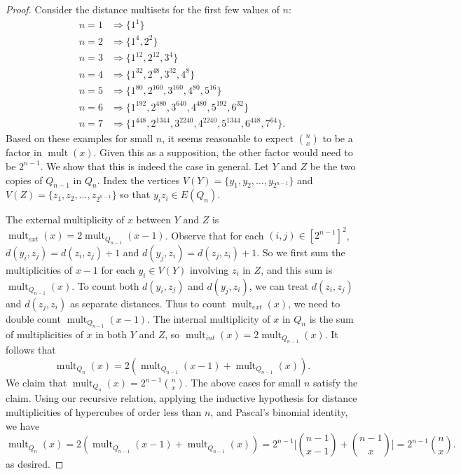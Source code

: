 \documentclass[12]{article}
\DeclareMathOperator{\mult}{mult}
\theoremstyle{definition}
\begin{document}
\begin{proof}
		Consider the distance multisets for the first few values of $n$:
		\begin{align*}
			n=1 &\Rightarrow \{1^1\}	\\
			n=2 &\Rightarrow \{1^4, 2^2\}	\\
			n=3 &\Rightarrow \{1^{12}, 2^{12}, 3^{4}\}	\\
			n=4 &\Rightarrow \{1^{32}, 2^{48}, 3^{32}, 4^{8}\}	\\
			n=5 &\Rightarrow \{1^{80}, 2^{160}, 3^{160}, 4^{80}, 5^{16}\}	\\
			n=6 &\Rightarrow \{1^{192}, 2^{480}, 3^{640}, 4^{480}, 5^{192}, 6^{32}\}	\\
			n=7 &\Rightarrow \{1^{448}, 2^{1344}, 3^{2240}, 4^{2240}, 5^{1344}, 6^{448}, 7^{64}\}.
		\end{align*}
		Based on these examples for small $n$, it seems reasonable to expect ${n \choose x}$ to be a factor in $\mult(x)$.  Given this as a supposition, the other factor would need to be $2^{n-1}$.  We show that this is indeed the case in general.
		Let $Y$ and $Z$ be the two copies of $Q_{n-1}$ in $Q_n$.  Index the vertices $V(Y) = \{y_1, y_2, \ldots, y_{2^{n-1}}\}$ and $V(Z) = \{z_1, z_2, \ldots, z_{2^{n-1}}\}$ so that $y_iz_i \in E(Q_n)$.  
		
		The external multiplicity of $x$ between $Y$ and $Z$ is $\mult_{ext}(x) = 2\mult_{Q_{n-1}}(x-1)$.  Observe that for each $(i,j) \in [2^{n-1}]^2$, $d(y_i,z_j) = d(z_i,z_j)+1$ and $d(y_j,z_i) = d(z_j,z_i) + 1$.  So we first sum the multiplicities of $x-1$ for each $y_i \in V(Y)$ involving $z_i$ in $Z$, and this sum is $\mult_{Q_{n-1}}(x)$.  To count both $d(y_i,z_j)$ and $d(y_j,z_i)$, we can treat $d(z_i,z_j)$ and $d(z_j,z_i)$ as separate distances.  Thus to count $\mult_{ext}(x)$, we need to double count $\mult_{Q_{n-1}}(x-1)$.  The internal multiplicity of $x$ in $Q_n$ is the sum of multiplicities of $x$ in both $Y$ and $Z$, so $\mult_{int}(x) = 2\mult_{Q_{n-1}}(x)$.  It follows that
		$$\mult_{Q_n}(x) = 2(\mult_{Q_{n-1}}(x-1) + \mult_{Q_{n-1}}(x)).$$
		We claim that $\mult_{Q_n}(x) = 2^{n-1}{n \choose x}$.  The above cases for small $n$ satisfy the claim.  Using our recursive relation, applying the inductive hypothesis for distance multiplicities of hypercubes of order less than $n$, and Pascal's binomial identity, we have 
		$$\mult_{Q_n}(x) = 2(\mult_{Q_{n-1}}(x-1) + \mult_{Q_{n-1}}(x))
			= 2^{n-1}\biggr[{n-1 \choose x-1} + {n-1 \choose x} \biggr]
			= 2^{n-1}{n \choose x}.$$
	as desired. \qedhere
	\end{proof}
	
\end{document}
